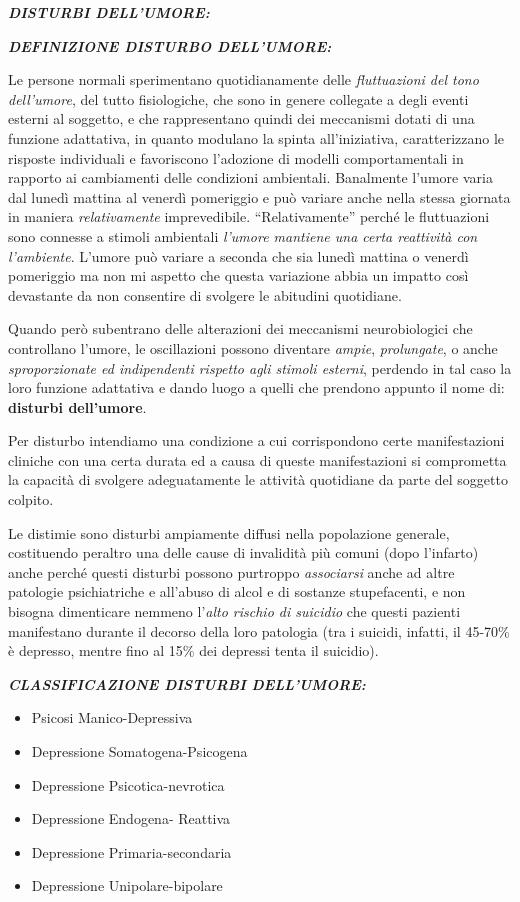 \documentclass[]{article}
\date{}
\begin{document}
\textbf{\emph{DISTURBI DELL'UMORE:}}

\textbf{\emph{DEFINIZIONE DISTURBO DELL'UMORE:}}

Le persone normali sperimentano quotidianamente delle \emph{fluttuazioni
del tono dell'umore}, del tutto fisiologiche, che sono in genere
collegate a degli eventi esterni al soggetto, e che rappresentano quindi
dei meccanismi dotati di una funzione adattativa, in quanto modulano la
spinta all'iniziativa, caratterizzano le risposte individuali e
favoriscono l'adozione di modelli comportamentali in rapporto ai
cambiamenti delle condizioni ambientali. Banalmente l'umore varia dal
lunedì mattina al venerdì pomeriggio e può variare anche nella stessa
giornata in maniera \emph{relativamente} imprevedibile.
``Relativamente'' perché le fluttuazioni sono connesse a stimoli
ambientali \emph{l'umore mantiene una certa reattività con l'ambiente}.
L'umore può variare a seconda che sia lunedì mattina o venerdì
pomeriggio ma non mi aspetto che questa variazione abbia un impatto così
devastante da non consentire di svolgere le abitudini quotidiane.

Quando però subentrano delle alterazioni dei meccanismi neurobiologici
che controllano l'umore, le oscillazioni possono diventare \emph{ampie},
\emph{prolungate}, o anche \emph{sproporzionate ed indipendenti rispetto
agli stimoli esterni}, perdendo in tal caso la loro funzione adattativa
e dando luogo a quelli che prendono appunto il nome di: \textbf{disturbi
dell'umore}.

Per disturbo intendiamo una condizione a cui corrispondono certe
manifestazioni cliniche con una certa durata ed a causa di queste
manifestazioni si comprometta la capacità di svolgere adeguatamente le
attività quotidiane da parte del soggetto colpito.

Le distimie sono disturbi ampiamente diffusi nella popolazione generale,
costituendo peraltro una delle cause di invalidità più comuni (dopo
l'infarto) anche perché questi disturbi possono purtroppo
\emph{associarsi} anche ad altre patologie psichiatriche e all'abuso di
alcol e di sostanze stupefacenti, e non bisogna dimenticare nemmeno
l'\emph{alto rischio di suicidio} che questi pazienti manifestano
durante il decorso della loro patologia (tra i suicidi, infatti, il
45-70\% è depresso, mentre fino al 15\% dei depressi tenta il suicidio).

\textbf{\emph{CLASSIFICAZIONE DISTURBI DELL'UMORE:}}

\begin{itemize}
\item
  Psicosi Manico-Depressiva
\item
  Depressione Somatogena-Psicogena
\item
  Depressione Psicotica-nevrotica
\item
  Depressione Endogena- Reattiva
\item
  Depressione Primaria-secondaria
\item
  Depressione Unipolare-bipolare
\end{itemize}
\end{document}
